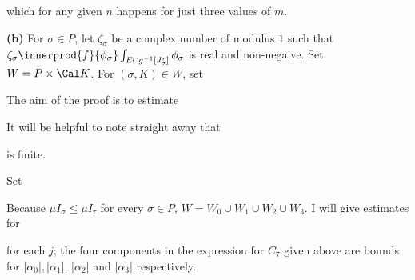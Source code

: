 {

\noindent which for any given $n$ happens for just three values of
$m$.\ \Qed

\medskip

{\bf (b)} For $\sigma\in P$, let $\zeta_{\sigma}$ be a complex number of
modulus $1$ such that
$\zeta_{\sigma}\innerprod{f}{\phi_{\sigma}}
   \int_{E\cap g^{-1}[J^r_{\sigma}]}\phi_{\sigma}$ is real and
non-negaive.   Set $W=P\times\Cal K$.   For $(\sigma,K)\in W$, set


\noindent The aim of the proof is to estimate


\noindent It will be helpful to note straight away that


\noindent is finite.

Set





\noindent Because $\mu I_{\sigma}\le\mu I_{\tau}$
for every $\sigma\in P$,
$W=W_0\cup W_1\cup W_2\cup W_3$.   I will give estimates for


\noindent for each $j$;  the four components in the expression for
$C_7$ given above are bounds for $|\alpha_0|, |\alpha_1|$, $|\alpha_2|$
and $|\alpha_3|$ respectively.


}
